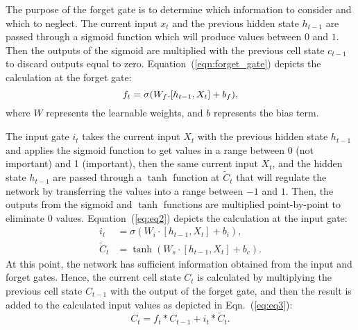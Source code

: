 The purpose of the forget gate is to determine which information to consider and which to neglect.
The current input \(x_t\) and the previous hidden state \(h_{t-1}\) are passed through a sigmoid function which will produce values between \(0\) and \(1\).
Then the outputs of the sigmoid are multiplied with the previous cell state \(c_{t-1}\) to discard outputs equal to zero.
Equation~(\ref{eqn:forget_gate}) depicts the calculation at the forget gate:
\begin{equation}
	\centering
	f_t = \sigma(W_f.[h_{t-1}, X_{t}]+ b_f),
	\label{eqn:forget_gate}
\end{equation}
where \(W\) represents the learnable weights, and \(b\) represents the bias term.

The input gate \(i_{t}\) takes the current input \(X_t\) with the previous hidden state \(h_{t-1}\) and applies the sigmoid function to get values in a range between 0 (not important) and 1 (important), then the same current input \(X_t\), and the hidden state \(h_{t-1}\) are passed through a \(\tanh\) function at \(\tilde{C}_{t}\) that will regulate the network by transferring the values into a range between \(-1\) and \(1\).
Then, the outputs from the sigmoid and \(\tanh\) functions are multiplied point-by-point to eliminate \(0\) values.
Equation~(\ref{eq:eq2}) depicts the calculation at the input gate:
\begin{equation}
	\begin{aligned}
		i_{t} &=\sigma\left(W_{i} \cdot\left[h_{t-1}, X_{t}\right]+b_{i}\right) ,
		\\
		\tilde{C}_{t} &=\tanh \left(W_{s} \cdot\left[h_{t-1}, X_{t}\right]+b_{c}\right).
	\end{aligned} \label{eq:eq2}
\end{equation}
At this point, the network has sufficient information obtained from the input and forget gates. 
Hence, the current cell state \(C_t\) is calculated by multiplying the previous cell state \(C_{t-1}\) with the output of the forget gate, and then the result is added to the calculated input values as depicted in Eqn.~(\ref{eq:eq3}):
\begin{equation}
	C_{t}=f_{t} * C_{t-1}+i_{t} * \tilde{C}_{t}.
	\label{eq:eq3}
\end{equation}


